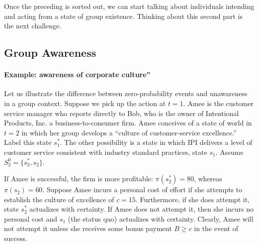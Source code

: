 \documentclass[
11pt,
titlepage,
reqno,
]{article}%
\theoremstyle{definition}
\begin{document}
	Once the preceding is sorted out, we can start talking about individuals intending and acting from a state of group existence. Thinking about this second part is the next challenge. %
	
	
	
	
	
	\subsection{Group Awareness}

\paragraph{Example: awareness of corporate culture''}

Let us illustrate the difference between zero-probability events and unawareness in a group context.
Suppose we pick up the action at $t=1$. 
Amee is the customer service manager who reports directly to Bob, who is the owner of Intentional Products, Inc. a business-to-consumer firm. 
Amee conceives of a state of world in $t=2$ in which her group develops a ``culture of customer-service excellence.'' 
Label this state $s^\ast_1$.  
The other possibility is a state in which IPI delivers a level of customer service consistent with industry standard practices, state $s_1$. 
Assume $S^0_2=\{s^\ast_2,s_2\}$.

If Amee is successful, the firm is more profitable: $\pi(s^\ast_2)=80$, whereas $\pi(s_2)=60$.
Suppose Amee incurs a personal cost of effort if she attempts to establish the culture of excellence of $c=15$. 
Furthermore, if she does attempt it, state $s^\ast_2$ actualizes with certainty.
If Amee does not attempt it, then she incurs no personal cost and $s_1$ (the status quo) actualizes with certainty.
Clearly, Amee will not attempt it unless she receives some bonus payment $B\ge c$ in the event of success.
	
\end{document}
